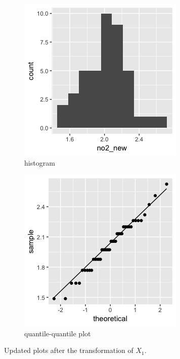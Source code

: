 \begin{figure}[H]
\begin{subfigure}{.5\textwidth}
  \centering
  \includegraphics[width=.8\linewidth]{plot_4_29_X1newhist.png}
  \caption{histogram}
  \label{fig:sfig1}
\end{subfigure}%
\begin{subfigure}{.5\textwidth}
  \centering
  \includegraphics[width=.8\linewidth]{plot_4_29_X1newqq.png}
  \caption{quantile-quantile plot}
  \label{fig:sfig2}
\end{subfigure}
\caption{Updated plots after the transformation of $X_1$.}
\end{figure}

